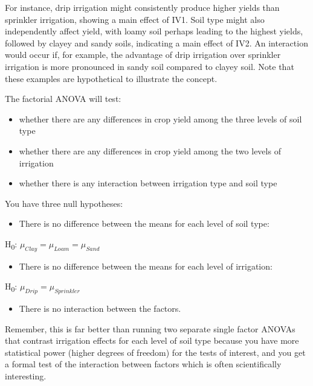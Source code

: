 \documentclass[
  letterpaper,
  DIV=11,
  numbers=noendperiod]{scrreprt}
\providecommand{\tightlist}{%
  \setlength{\itemsep}{0pt}\setlength{\parskip}{0pt}}
\begin{document}
For instance, drip irrigation might consistently produce higher yields
than sprinkler irrigation, showing a main effect of IV1. Soil type might
also independently affect yield, with loamy soil perhaps leading to the
highest yields, followed by clayey and sandy soils, indicating a main
effect of IV2. An interaction would occur if, for example, the advantage
of drip irrigation over sprinkler irrigation is more pronounced in sandy
soil compared to clayey soil. Note that these examples are hypothetical
to illustrate the concept.

The factorial ANOVA will test:

\begin{itemize}
\tightlist
\item
  whether there are any differences in crop yield among the three levels
  of soil type
\item
  whether there are any differences in crop yield among the two levels
  of irrigation
\item
  whether there is any interaction between irrigation type and soil type
\end{itemize}

You have three null hypotheses:

\begin{itemize}
\tightlist
\item
  There is no difference between the means for each level of soil type:
\end{itemize}

H\textsubscript{0}: \(\mu_{Clay} = \mu_{Loam} = \mu_{Sand}\)\\

\begin{itemize}
\tightlist
\item
  There is no difference between the means for each level of irrigation:
\end{itemize}

H\textsubscript{0}: \(\mu_{Drip} = \mu_{Sprinkler}\)\\

\begin{itemize}
\tightlist
\item
  There is no interaction between the factors.
\end{itemize}

Remember, this is far better than running two separate single factor
ANOVAs that contrast irrigation effects for each level of soil type
because you have more statistical power (higher degrees of freedom) for
the tests of interest, and you get a formal test of the interaction
between factors which is often scientifically interesting.
\end{document}
